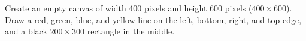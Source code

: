 Create an empty canvas of width 400 pixels and height 600 pixels ($400\times 600$). Draw a red, green, blue, and yellow line on the left, bottom, right, and top edge, and a black $200\times 300$ rectangle in the middle.